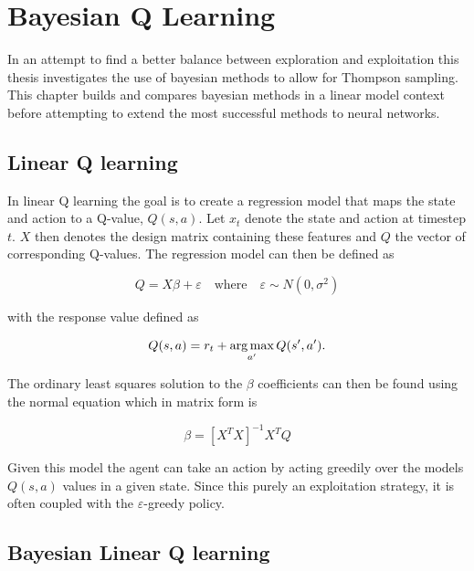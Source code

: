 \chapter{Bayesian Q Learning}{\label{ch:bdqn}}

In an attempt to find a better balance between exploration and exploitation this thesis investigates the use of bayesian methods to allow for Thompson sampling. This chapter builds and compares bayesian methods in a linear model context before attempting to extend the most successful methods to neural networks.

\section{Linear Q learning}

In linear Q learning the goal is to create a regression model that maps the state and action to a Q-value, $Q(s,a)$. Let $x_t$ denote the state and action at timestep $t$. $X$ then denotes the design matrix containing these features and $Q$ the vector of corresponding Q-values. The regression model can then be defined as

\begin{equation*}
	Q = X\beta + \varepsilon \quad \text{where} \quad \varepsilon \sim N(0,\sigma^2)
\end{equation*}

with the response value defined as 

\begin{equation}
    \label{eq:q_target}
	Q(s,a) = r_t + \operatorname*{arg\,max}_{a'}Q(s',a').
\end{equation}

The ordinary least squares solution to the $\beta$ coefficients can then be found using the normal equation which in matrix form is

\begin{equation*}
	\beta = [X^TX]^{-1}X^TQ
\end{equation*}

Given this model the agent can take an action by acting greedily over the models $Q(s,a)$ values in a given state. Since this purely an exploitation strategy, it is often coupled with the $\varepsilon$-greedy policy.

\section{Bayesian Linear Q learning}

